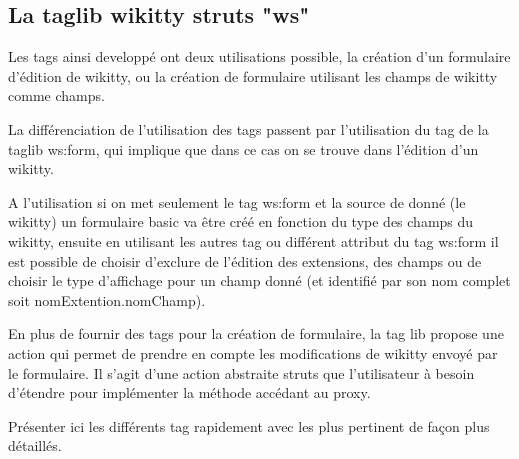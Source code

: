 


\subsection{La taglib wikitty struts "ws"}

Les tags ainsi developpé ont deux utilisations possible, la création d'un 
formulaire d'édition de wikitty, ou la création de formulaire utilisant les 
champs de wikitty comme champs. 

La différenciation de l'utilisation des tags passent par l'utilisation du tag 
de la taglib ws:form, qui implique que dans ce cas on se trouve dans l'édition d'un
wikitty.

A l'utilisation si on met seulement le tag ws:form et la source de donné 
(le wikitty) un formulaire basic va être créé en fonction du type des champs
du wikitty, ensuite en utilisant les autres tag ou différent attribut du tag 
ws:form il est possible de choisir d'exclure de l'édition des extensions,
des champs ou de choisir le type d'affichage pour un champ donné (et identifié
par son nom complet soit nomExtention.nomChamp).

En plus de fournir des tags pour la création de formulaire, la tag lib propose 
une action qui permet de prendre en compte les modifications de wikitty envoyé
par le formulaire. Il s'agit d'une action abstraite struts que l'utilisateur à 
besoin d'étendre pour implémenter la méthode accédant au proxy.


Présenter ici les différents tag rapidement avec les plus pertinent de façon plus 
détaillés.





